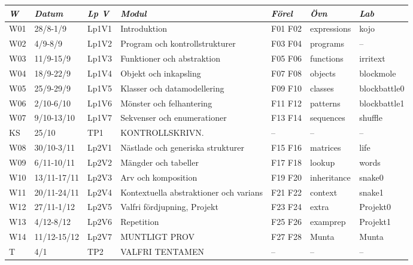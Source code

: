 \begin{tabular}{l|l|l|l|l|l|l}
\textit{W} & \textit{Datum} & \textit{Lp V} & \textit{Modul} & \textit{Förel} & \textit{Övn} & \textit{Lab} \\ \hline \hline
W01 & 28/8-1/9 & Lp1V1 & Introduktion & F01 F02 & expressions & kojo \\
W02 & 4/9-8/9 & Lp1V2 & Program och kontrollstrukturer & F03 F04 & programs & -- \\
W03 & 11/9-15/9 & Lp1V3 & Funktioner och abstraktion & F05 F06 & functions & irritext \\
W04 & 18/9-22/9 & Lp1V4 & Objekt och inkapsling & F07 F08 & objects & blockmole \\
W05 & 25/9-29/9 & Lp1V5 & Klasser och datamodellering & F09 F10 & classes & blockbattle0 \\
W06 & 2/10-6/10 & Lp1V6 & Mönster och felhantering & F11 F12 & patterns & blockbattle1 \\
W07 & 9/10-13/10 & Lp1V7 & Sekvenser och enumerationer & F13 F14 & sequences & shuffle \\
KS & 25/10 & TP1 & KONTROLLSKRIVN. & -- & -- & -- \\
W08 & 30/10-3/11 & Lp2V1 & Nästlade och generiska strukturer & F15 F16 & matrices & life \\
W09 & 6/11-10/11 & Lp2V2 & Mängder och tabeller & F17 F18 & lookup & words \\
W10 & 13/11-17/11 & Lp2V3 & Arv och komposition & F19 F20 & inheritance & snake0 \\
W11 & 20/11-24/11 & Lp2V4 & Kontextuella abstraktioner och varians & F21 F22 & context & snake1 \\
W12 & 27/11-1/12 & Lp2V5 & Valfri fördjupning, Projekt & F23 F24 & extra & Projekt0 \\
W13 & 4/12-8/12 & Lp2V6 & Repetition & F25 F26 & examprep & Projekt1 \\
W14 & 11/12-15/12 & Lp2V7 & MUNTLIGT PROV & F27 F28 & Munta & Munta \\
T & 4/1 & TP2 & VALFRI TENTAMEN & -- & -- & -- \\
\end{tabular}
